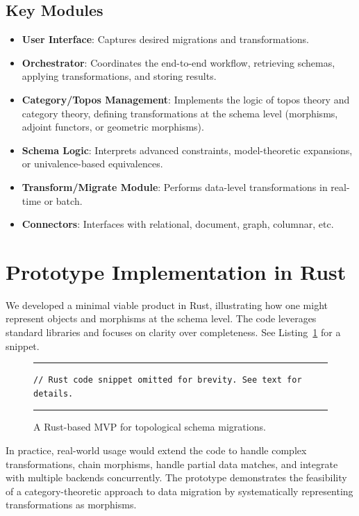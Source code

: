 \documentclass[11pt]{article}
\begin{document}
\subsection{Key Modules}
\begin{itemize}
    \item \textbf{User Interface}: Captures desired migrations and transformations.  
    \item \textbf{Orchestrator}: Coordinates the end-to-end workflow, retrieving schemas, applying transformations, and storing results.  
    \item \textbf{Category/Topos Management}: Implements the logic of topos theory and category theory, defining transformations at the schema level (morphisms, adjoint functors, or geometric morphisms).  
    \item \textbf{Schema Logic}: Interprets advanced constraints, model-theoretic expansions, or univalence-based equivalences.  
    \item \textbf{Transform/Migrate Module}: Performs data-level transformations in real-time or batch.  
    \item \textbf{Connectors}: Interfaces with relational, document, graph, columnar, etc.
\end{itemize}

\section{Prototype Implementation in Rust}
We developed a minimal viable product in Rust, illustrating how one might represent objects and morphisms at the schema level. The code leverages standard libraries and focuses on clarity over completeness. See Listing~\ref{lst:rust} for a snippet.

\begin{figure}[h]
\hrule
\begin{verbatim}
// Rust code snippet omitted for brevity. See text for details.
\end{verbatim}
\hrule
\caption{A Rust-based MVP for topological schema migrations.}
\label{lst:rust}
\end{figure}

In practice, real-world usage would extend the code to handle complex transformations, chain morphisms, handle partial data matches, and integrate with multiple backends concurrently. The prototype demonstrates the feasibility of a category-theoretic approach to data migration by systematically representing transformations as morphisms.
\end{document}
